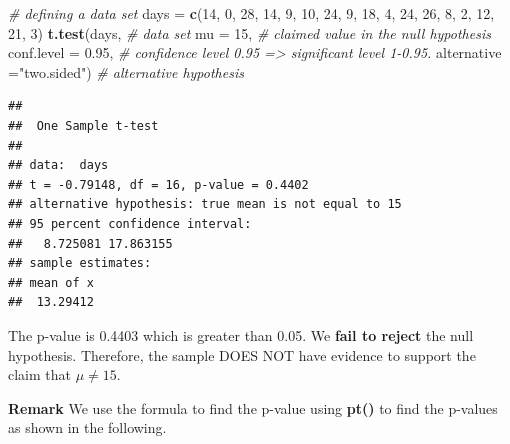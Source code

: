 \documentclass[
]{book}
\newenvironment{Shaded}{\begin{snugshade}}{\end{snugshade}}
\newcommand{\AttributeTok}[1]{\textcolor[rgb]{0.13,0.29,0.53}{#1}}
\newcommand{\CommentTok}[1]{\textcolor[rgb]{0.56,0.35,0.01}{\textit{#1}}}
\newcommand{\DecValTok}[1]{\textcolor[rgb]{0.00,0.00,0.81}{#1}}
\newcommand{\FloatTok}[1]{\textcolor[rgb]{0.00,0.00,0.81}{#1}}
\newcommand{\FunctionTok}[1]{\textcolor[rgb]{0.13,0.29,0.53}{\textbf{#1}}}
\newcommand{\NormalTok}[1]{#1}
\newcommand{\OtherTok}[1]{\textcolor[rgb]{0.56,0.35,0.01}{#1}}
\newcommand{\StringTok}[1]{\textcolor[rgb]{0.31,0.60,0.02}{#1}}
\begin{document}
\begin{Shaded}
\begin{Highlighting}[]
\CommentTok{\# defining a data set}
\NormalTok{days }\OtherTok{=} \FunctionTok{c}\NormalTok{(}\DecValTok{14}\NormalTok{, }\DecValTok{0}\NormalTok{, }\DecValTok{28}\NormalTok{, }\DecValTok{14}\NormalTok{, }\DecValTok{9}\NormalTok{, }\DecValTok{10}\NormalTok{, }\DecValTok{24}\NormalTok{, }\DecValTok{9}\NormalTok{, }\DecValTok{18}\NormalTok{, }\DecValTok{4}\NormalTok{, }\DecValTok{24}\NormalTok{, }\DecValTok{26}\NormalTok{, }\DecValTok{8}\NormalTok{, }\DecValTok{2}\NormalTok{, }\DecValTok{12}\NormalTok{, }\DecValTok{21}\NormalTok{, }\DecValTok{3}\NormalTok{) }
\FunctionTok{t.test}\NormalTok{(days,                         }\CommentTok{\# data set}
       \AttributeTok{mu =} \DecValTok{15}\NormalTok{,                    }\CommentTok{\# claimed value in the null hypothesis}
       \AttributeTok{conf.level =} \FloatTok{0.95}\NormalTok{,     }\CommentTok{\# confidence level 0.95 =\textgreater{} significant level 1{-}0.95.}
       \AttributeTok{alternative =}\StringTok{"two.sided"}\NormalTok{)  }\CommentTok{\# alternative hypothesis}
\end{Highlighting}
\end{Shaded}

\begin{verbatim}
## 
##  One Sample t-test
## 
## data:  days
## t = -0.79148, df = 16, p-value = 0.4402
## alternative hypothesis: true mean is not equal to 15
## 95 percent confidence interval:
##   8.725081 17.863155
## sample estimates:
## mean of x 
##  13.29412
\end{verbatim}

The p-value is 0.4403 which is greater than 0.05. We \textbf{fail to reject} the null hypothesis. Therefore, the sample DOES NOT have evidence to support the claim that \(\mu \ne 15\).

\textbf{Remark} We use the formula to find the p-value using \textbf{pt()} to find the p-values as shown in the following.
\end{document}
